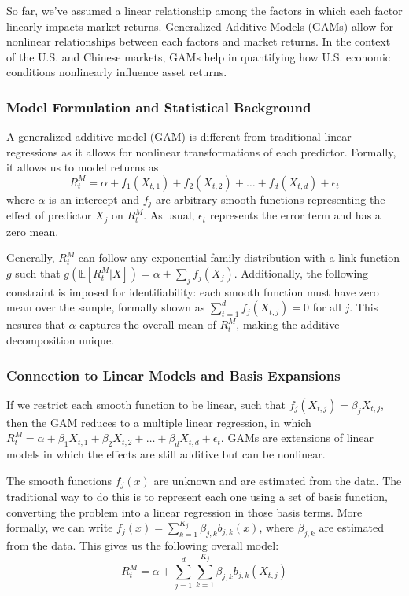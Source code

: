 So far, we've assumed a linear relationship among the factors in which each factor linearly impacts market returns. Generalized Additive Models (GAMs) allow for nonlinear relationships between each factors and market returns. In the context of the U.S. and Chinese markets, GAMs help in quantifying how U.S. economic conditions nonlinearly influence asset returns. 

\subsubsection{Model Formulation and Statistical Background}

A generalized additive model (GAM) is different from traditional linear regressions as it allows for nonlinear transformations of each predictor. Formally, it allows us to model returns as $$R_t^M=\alpha+f_1(X_{t, 1})+f_2(X_{t, 2})+\dots+f_d(X_{t, d})+\epsilon_t$$ where $\alpha$ is an intercept and $f_j$ are arbitrary smooth functions representing the effect of predictor $X_j$ on $R_t^M$. As usual, $\epsilon_t$ represents the error term and has a zero mean.

Generally, $R_t^M$ can follow any exponential-family distribution with a link function $g$ such that $g(\mathbb{E}[R_t^M|X])=\alpha+\sum_{j}f_j(X_j)$. Additionally, the following constraint is imposed for identifiability: each smooth function must have zero mean over the sample, formally shown as $\sum_{t=1}^d f_j(X_{t, j})=0$ for all $j$. This nesures that $\alpha$ captures the overall mean of $R_t^M$, making the additive decomposition unique.

\subsubsection{Connection to Linear Models and Basis Expansions}

If we restrict each smooth function to be linear, such that $f_j(X_{t, j})=\beta_j X_{t, j}$, then the GAM reduces to a multiple linear regression, in which $R_t^M=\alpha+\beta_1 X_{t, 1}+\beta_2 X_{t, 2}+\dots+\beta_d X_{t, d}+\epsilon_t$. GAMs are extensions of linear models in which the effects are still additive but can be nonlinear.

The smooth functions $f_j(x)$ are unknown and are estimated from the data. The traditional way to do this is to represent each one using a set of basis function, converting the problem into a linear regression in those basis terms. More formally, we can write $f_j(x)=\sum_{k=1}^{K_j}\beta_{j,k}b_{j,k}(x)$, where $\beta_{j,k}$ are estimated from the data. This gives us the following overall model: $$R_t^M=\alpha+\sum_{j=1}^d\sum_{k=1}^{K_j}\beta_{j,k}b_{j,k}(X_{t,j})$$

